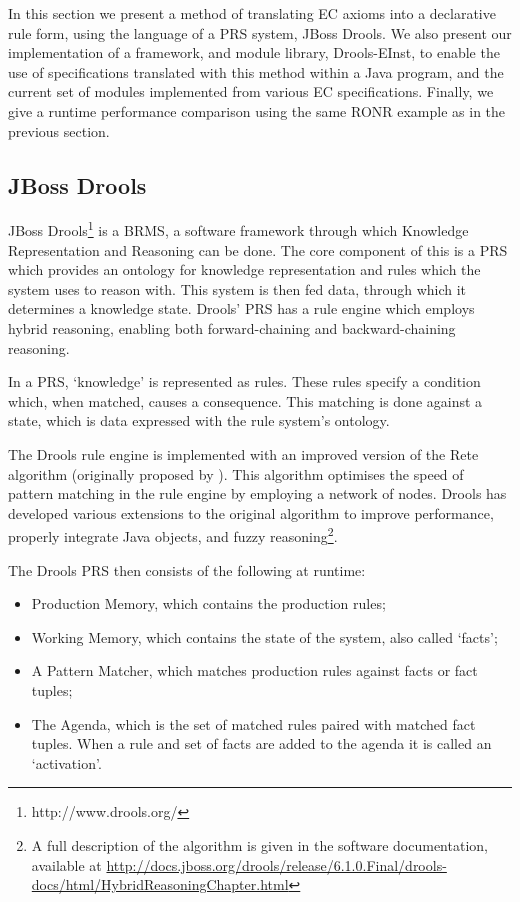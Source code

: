 In this section we present a method of translating \ac{EC} axioms into a
declarative rule form, using the language of a \acl{PRS} system, JBoss Drools.
We also present our implementation of a framework, and module library, 
Drools-EInst, to enable the use of specifications translated with this method within
a Java program, and the current set of modules implemented from various
\ac{EC} specifications. Finally, we give a runtime performance comparison
using the same \ac{RONR} example as in the previous section.

\subsection{JBoss Drools}

JBoss Drools\footnote{http://www.drools.org/} is a \ac{BRMS}, a software framework through which Knowledge
Representation and Reasoning can be done. The core component of this is a \ac{PRS}
which provides an ontology for knowledge representation and rules which the system
uses to reason with. This system is then fed data, through which it determines a
knowledge state. Drools' \ac{PRS} has a rule engine which employs hybrid reasoning,
enabling both forward-chaining and backward-chaining reasoning.

In a \ac{PRS}, `knowledge' is represented as rules. These rules specify a
condition which, when matched, causes a consequence. This matching is done
against a state, which is data expressed with the rule system's ontology. 

The Drools rule engine is implemented with an improved version of the Rete
algorithm (originally proposed by \citet{Forgy1982}). This algorithm optimises
the speed of pattern matching in the rule engine by employing a network of
nodes. Drools has developed various extensions to the original algorithm to
improve performance, properly integrate Java objects, and fuzzy reasoning\footnote{A full description of the algorithm is given in the software
documentation, available at \url{http://docs.jboss.org/drools/release/6.1.0.Final/drools-docs/html/HybridReasoningChapter.html}}.

The Drools \ac{PRS} then consists of the following at runtime:
\begin{itemize}
	\item Production Memory, which contains the production rules;
	\item Working Memory, which contains the state of the system, also called `facts';
	\item A Pattern Matcher, which matches production rules against facts or fact
	tuples;
	\item The Agenda, which is the set of matched rules paired with matched fact
	tuples. When a rule and set of facts are added to the agenda it is called an `activation'.
\end{itemize}

